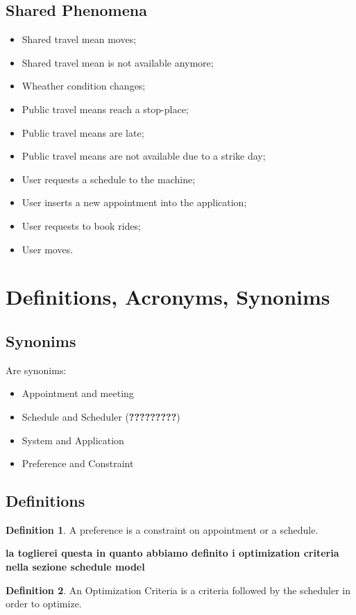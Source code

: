 \subsection{Shared Phenomena}
\begin{itemize}
\item Shared travel mean moves;
\item Shared travel mean is not available anymore;
\item Wheather condition changes;
\item Public travel means reach a stop-place;
\item Public travel means are late; 
\item Public travel means are not available due to a strike day;
\item User requests a schedule to the machine;
\item User inserts a new appointment into the application;
\item User requests to book rides;
\item User moves.
\end{itemize}

\section{Definitions, Acronyms, Synonims}

\subsection{Synonims}
Are synonims:
\begin{itemize}
\item Appointment and meeting
\item Schedule and Scheduler (\textbf{?????????})
\item System and Application
\item Preference and Constraint
\end{itemize}

\subsection{Definitions}
\theoremstyle{definition}
\newtheorem{definition}{Definition}[section]
 
\begin{definition}
A preference is a constraint on appointment or a schedule.
\end{definition}

\textbf{la toglierei questa in quanto abbiamo definito i optimization criteria nella sezione schedule model}
\begin{definition}
An Optimization Criteria is a criteria followed by the scheduler in order to optimize.
\end{definition}

